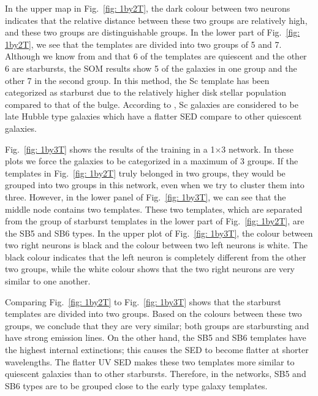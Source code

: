         
            In the upper map in Fig.~\ref{fig: 1by2T}, the dark colour between two neurons indicates that the relative distance between these two groups are relatively high, and these two groups are distinguishable groups.
            In the lower part of Fig.~\ref{fig: 1by2T}, we see that the templates are divided into two groups of 5 and 7.
            Although we know from  and  that 6 of the templates are quiescent and the other 6 are starbursts, the SOM results show 5 of the galaxies in one group and the other 7 in the second group.
            In this method, the Sc template has been categorized as starburst due to the relatively higher disk stellar population compared to that of the bulge. 
            According to , Sc galaxies are considered to be late Hubble type galaxies which have a flatter SED compare to other quiescent galaxies. 
            

            Fig.~\ref{fig: 1by3T} shows the results of the training in a 1$\times$3 network.
            In these plots we force the galaxies to be categorized in a maximum of 3 groups. 
            If the templates in Fig.~\ref{fig: 1by2T} truly belonged in two groups, they would be grouped into two groups in this network, even when we try to cluster them into three. 
            However, in the lower panel of Fig.~\ref{fig: 1by3T}, we can see that the middle node contains two templates.
            These two templates, which are separated from the group of starburst templates in the lower part of Fig.~\ref{fig: 1by2T},  are the SB5 and SB6 types.
            In the upper plot of Fig.~\ref{fig: 1by3T}, the colour between two right neurons is black and the colour between two left neurons is white. 
            The black colour indicates that the left neuron is completely different from the other two groups,
            while the white colour shows that the two right neurons are very similar to one another. 
            
            Comparing Fig.~\ref{fig: 1by2T} to Fig.~\ref{fig: 1by3T} shows that the starburst templates are divided into two groups. 
            Based on the colours between these two groups, we conclude that they are very similar; both groups are starbursting and have strong emission lines.
            On the other hand, the SB5 and SB6 templates have the highest internal extinctions; this causes the SED to become flatter at shorter wavelengths. 
            The flatter UV SED makes these two templates more similar to quiescent galaxies than to other starbursts.
            Therefore, in the networks, SB5 and SB6 types are to be grouped close to the early type galaxy templates.
                
